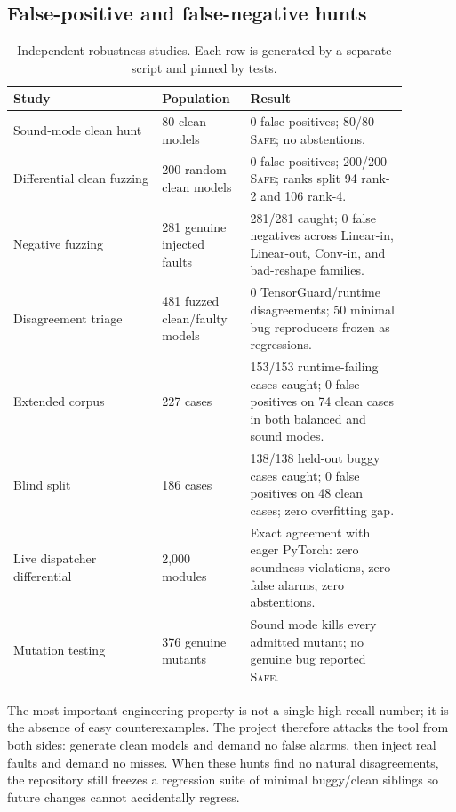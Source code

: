 \documentclass[11pt]{article}
\newcommand{\safe}{\textsc{Safe}}
\begin{document}
\subsection{False-positive and false-negative hunts}

\begin{table}[h]
\centering
\small
\begin{tabular}{p{0.34\linewidth} p{0.18\linewidth} p{0.36\linewidth}}
\toprule
\textbf{Study} & \textbf{Population} & \textbf{Result} \\
\midrule
Sound-mode clean hunt & 80 clean models & 0 false positives; 80/80 \safe{};
no abstentions. \\
Differential clean fuzzing & 200 random clean models & 0 false positives;
200/200 \safe{}; ranks split 94 rank-2 and 106 rank-4. \\
Negative fuzzing & 281 genuine injected faults & 281/281 caught; 0 false
negatives across Linear-in, Linear-out, Conv-in, and bad-reshape families. \\
Disagreement triage & 481 fuzzed clean/faulty models & 0 TensorGuard/runtime
disagreements; 50 minimal bug reproducers frozen as regressions. \\
Extended corpus & 227 cases & 153/153 runtime-failing cases caught; 0 false
positives on 74 clean cases in both balanced and sound modes. \\
Blind split & 186 cases & 138/138 held-out buggy cases caught; 0 false
positives on 48 clean cases; zero overfitting gap. \\
Live dispatcher differential & 2,000 modules & Exact agreement with eager
PyTorch: zero soundness violations, zero false alarms, zero abstentions. \\
Mutation testing & 376 genuine mutants & Sound mode kills every admitted
mutant; no genuine bug reported \safe{}. \\
\bottomrule
\end{tabular}
\caption{Independent robustness studies.  Each row is generated by a separate
script and pinned by tests.}
\label{tab:robustness}
\end{table}

The most important engineering property is not a single high recall number; it
is the absence of easy counterexamples.  The project therefore attacks the tool
from both sides: generate clean models and demand no false alarms, then inject
real faults and demand no misses.  When these hunts find no natural
disagreements, the repository still freezes a regression suite of minimal
buggy/clean siblings so future changes cannot accidentally regress.
\end{document}
